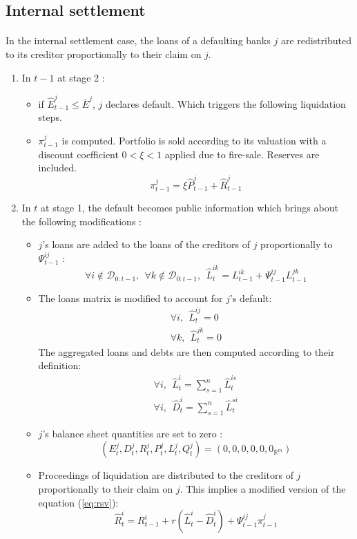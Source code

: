 \documentclass{article}
\newcommand{\wh}{\widehat}
\begin{document}
\subsection{Internal settlement}\label{internal settlement}

\paragraph{}
In the internal settlement case, the loans of a defaulting banks $j$ are redistributed to its creditor proportionally to their claim on $j$.

\begin{enumerate}

    \item In $t-1$ at stage 2 :
    \begin{itemize}
        \item if $\widehat{E}_{t-1}^j \leq \bar{E}^j$, $j$ declares default. Which triggers the following liquidation steps.
        \item $\pi_{t-1}^j$ is computed. Portfolio is sold according to its valuation with a discount coefficient $0 < \xi < 1$ applied due to fire-sale. Reserves are included. $$\pi_{t-1}^j = \xi \widehat{P}_{t-1}^j + \widehat{R}_{t-1}^j$$
    \end{itemize}
    \item In $t$ at stage 1, the default becomes public information which brings about the following modifications : 
    \begin{itemize}
        \item $j$'s loans are added to the loans of the creditors of $j$ proportionally to $\Psi_{t-1}^{ij}$ :
        $$\forall i \notin \mathcal{D}_{0:t-1},~~\forall k \notin \mathcal{D}_{0:t-1},  ~~ \wh L_t^{ik} = L_{t-1}^{ik} + \Psi_{t-1}^{ij} L_{t-1}^{jk}$$
        \item The loans matrix is modified to account for $j$'s default:
        \begin{eqnarray*}
        \forall i,~~ \wh L_t^{ij} = 0 \\
        \forall k,~~ \wh L_t^{jk} = 0
        \end{eqnarray*}
        The aggregated loans and debts are then computed according to their definition:
        \begin{eqnarray*}
        \forall i,~~ \wh L_t^i = \sum_{s=1}^n \wh L_t^{is} \\
        \forall i,~~ \wh D_t^i = \sum_{s=1}^n \wh L_t^{si}
        \end{eqnarray*}
        \item $j$'s balance sheet quantities are set to zero :
        $$(E_t^j, D_t^j, R_t^j, P_t^j, L_t^j, Q_t^j) = (0, 0, 0, 0, 0, 0_{\mathbb{R}^m}) $$
        \item Proceedings of liquidation are distributed to the creditors of $j$ proportionally to their claim on $j$. This implies a modified version of the equation (\ref{eq:rsv}): 
        $$ \widehat{R}_t^i = R_{t-1}^i + r (\wh L_t^i - \wh D_t^i) + \Psi_{t-1}^{ij} \pi_{t-1}^j$$


\end{itemize}
\end{enumerate}
\end{document}

